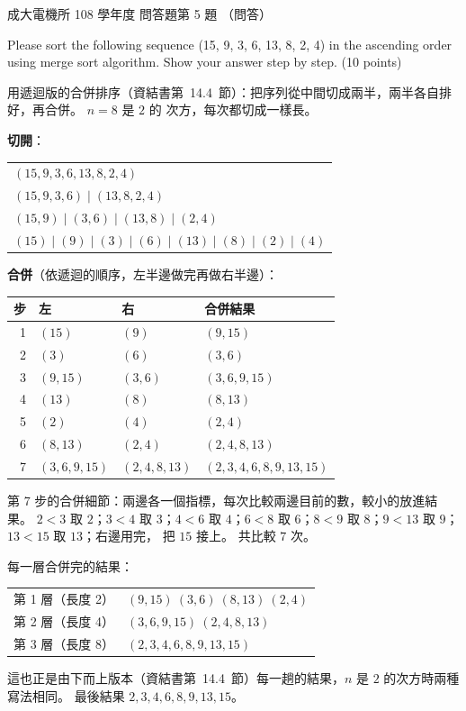 \begin{pastexam}[label={px:ncku-108-ee-ds-06}]{成大電機所 108 學年度 問答題第 5 題}
（問答）

Please sort the following sequence (15, 9, 3, 6, 13, 8, 2, 4) in the ascending order using merge
sort algorithm. Show your answer step by step. (10 points)
\end{pastexam}

\begin{pastsoln}
用遞迴版的合併排序（資結書第~14.4~節）：把序列從中間切成兩半，兩半各自排好，再合併。 $n = 8$ 是 $2$ 的
次方，每次都切成一樣長。

\textbf{切開}：
\begin{center}
\begin{tabular}{l}
$(15, 9, 3, 6, 13, 8, 2, 4)$ \\
$(15, 9, 3, 6) \mid (13, 8, 2, 4)$ \\
$(15, 9) \mid (3, 6) \mid (13, 8) \mid (2, 4)$ \\
$(15) \mid (9) \mid (3) \mid (6) \mid (13) \mid (8) \mid (2) \mid (4)$ \\
\end{tabular}
\end{center}

\textbf{合併}（依遞迴的順序，左半邊做完再做右半邊）：
\begin{center}
\begin{tabular}{rlll}
\toprule
步 & 左 & 右 & 合併結果 \\
\midrule
1 & $(15)$ & $(9)$ & $(9, 15)$ \\
2 & $(3)$ & $(6)$ & $(3, 6)$ \\
3 & $(9, 15)$ & $(3, 6)$ & $(3, 6, 9, 15)$ \\
4 & $(13)$ & $(8)$ & $(8, 13)$ \\
5 & $(2)$ & $(4)$ & $(2, 4)$ \\
6 & $(8, 13)$ & $(2, 4)$ & $(2, 4, 8, 13)$ \\
7 & $(3, 6, 9, 15)$ & $(2, 4, 8, 13)$ & $(2, 3, 4, 6, 8, 9, 13, 15)$ \\
\bottomrule
\end{tabular}
\end{center}

第 7 步的合併細節：兩邊各一個指標，每次比較兩邊目前的數，較小的放進結果。
$2 < 3$ 取 $2$；$3 < 4$ 取 $3$；$4 < 6$ 取 $4$；$6 < 8$ 取 $6$；$8 < 9$ 取 $8$；$9 < 13$ 取 $9$；$13 < 15$ 取 $13$；右邊用完，
把 $15$ 接上。 共比較 $7$ 次。

每一層合併完的結果：
\begin{center}
\begin{tabular}{ll}
第 1 層（長度 2） & $(9, 15)\ (3, 6)\ (8, 13)\ (2, 4)$ \\
第 2 層（長度 4） & $(3, 6, 9, 15)\ (2, 4, 8, 13)$ \\
第 3 層（長度 8） & $(2, 3, 4, 6, 8, 9, 13, 15)$ \\
\end{tabular}
\end{center}
這也正是由下而上版本（資結書第~14.4~節）每一趟的結果，$n$ 是 $2$ 的次方時兩種寫法相同。 最後結果
$2, 3, 4, 6, 8, 9, 13, 15$。
\end{pastsoln}
